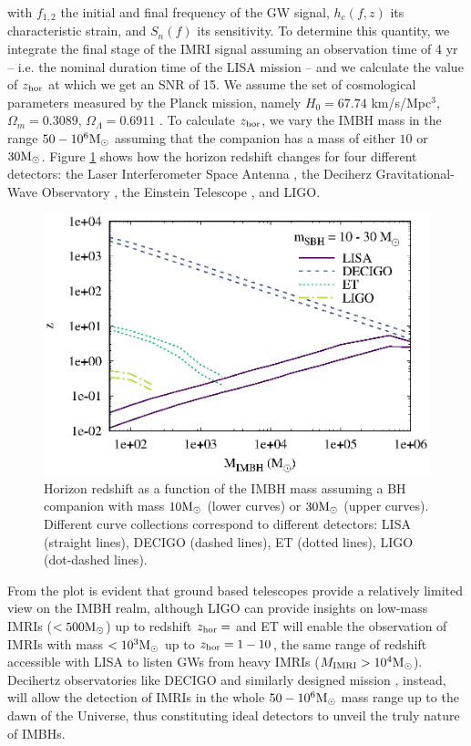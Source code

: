 \documentclass[twocolumn]{aastex62}
\newcommand{\Ms}{{\rm M}_\odot}
\newcommand{\imri}{{\rm IMRI}}
\begin{document}
with $f_{1,2}$ the initial and final frequency of the GW signal, $h_c(f,z)$ its characteristic strain, and $S_n(f)$ its sensitivity. To determine this quantity, we integrate the final stage of the IMRI signal assuming an observation time of 4 yr -- i.e. the nominal duration time of the LISA mission -- and we calculate the value of $z_{\rm hor}$ at which we get an SNR of 15. We assume the set of cosmological parameters measured by the Planck mission, namely $H_0 = 67.74$ km/s/Mpc$^{3}$, $\Omega_m = 0.3089$, $\Omega_\Lambda = 0.6911$ \citep{planck15}. To calculate $z_{\rm hor}$, we vary the IMBH mass in the range $50-10^6\Ms$ assuming that the companion has a mass of either $10$ or $30\Ms$. Figure \ref{fig:fhor} shows how the horizon redshift changes for four different detectors: the Laser Interferometer Space Antenna \citep[LISA\footnote{\url{https://www.elisascience.org/}},][]{amaro12}, the Deciherz Gravitational-Wave Observatory \citep[DECIGO\footnote{\url{http://tamago.mtk.nao.ac.jp/spacetime/decigo_e.html}},][]{seto01}, the Einstein Telescope \citep[ET\footnote{\url{http://www.et-gw.eu/}},][]{punturo10}, and LIGO. 


\begin{figure}
\centering
\includegraphics[width=\columnwidth]{horizon_IMBH}
\caption{Horizon redshift as a function of the IMBH mass assuming a BH companion with mass $10 \Ms$ (lower curves) or $30\Ms$ (upper curves). Different curve collections correspond to different detectors: LISA (straight lines), DECIGO (dashed lines), ET (dotted lines), LIGO (dot-dashed lines). }
\label{fig:fhor}
\end{figure}

From the plot is evident that ground based telescopes provide a relatively limited view on the IMBH realm, although LIGO can provide insights on low-mass IMRIs ($<500\Ms$) up to redshift $z_{\rm hor} = $ and ET will enable the observation of IMRIs with mass $<10^3\Ms$ up to $z_{\rm hor} = 1-10$, the same range of redshift accessible with LISA to listen GWs from heavy IMRIs ($M_{\imri}>10^4\Ms$). Decihertz observatories like DECIGO \citep{KawamuraEtAl2011} and similarly designed mission \citep{arca19}, instead, will allow the detection of IMRIs in the whole $50-10^6\Ms$ mass range up to the dawn of the Universe, thus constituting ideal detectors to unveil the truly nature of IMBHs. 
\end{document}

